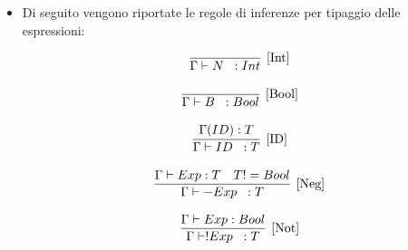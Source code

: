 \documentclass[12pt,twoside,openright,a4paper]{report}
\begin{document}
\begin{itemize}
    \item Di seguito vengono riportate le regole di inferenze per tipaggio delle espressioni:
    
    
    
    \begin{align*}
    \infer[\mathrm{[Int]}]
    {\Gamma \vdash  N\hspace{0.2cm} : Int  } 
    {   }
    \end{align*}
    
    
    \begin{align*}
    \infer[\mathrm{[Bool]}]
    {\Gamma \vdash  B\hspace{0.2cm} : Bool  } 
    {   }
    \end{align*}

    
    \begin{align*}
    \infer[\mathrm{[ID]}]
    {\Gamma \vdash  ID\hspace{0.2cm} : T  } 
    { \Gamma(ID):T  }
    \end{align*}
    
    \begin{align*}
    \infer[\mathrm{[Neg]}]
    {\Gamma \vdash  -Exp\hspace{0.2cm} : T  } 
    { \Gamma \vdash Exp : T & T!=Bool  }
    \end{align*}
    
    \begin{align*}
    \infer[\mathrm{[Not]}]
    {\Gamma \vdash  !Exp\hspace{0.2cm} : T  } 
    { \Gamma \vdash Exp : Bool }
    \end{align*}
    
    
    
\end{itemize}
\end{document}
